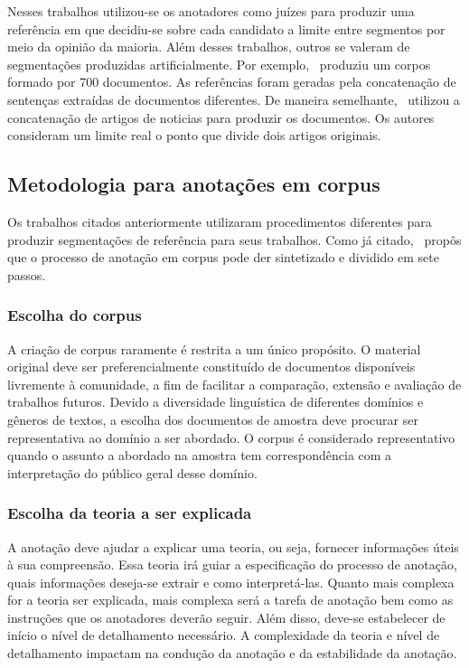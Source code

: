 Nesses trabalhos utilizou-se os anotadores como juízes para produzir uma referência em que decidiu-se sobre cada candidato a limite entre segmentos por meio da opinião da maioria. Além desses trabalhos, outros se valeram de segmentações produzidas artificialmente. Por exemplo,~\cite{Choi2000a} produziu um corpos formado por 700 documentos. As referências foram geradas pela concatenação de sentenças extraídas de documentos diferentes. De maneira semelhante,~\cite{CHAIBI2014} utilizou a concatenação de artigos de noticias para produzir os documentos. Os autores consideram um limite real o ponto que divide dois artigos originais. 

\subsection{Metodologia para anotações em corpus}
\label{subsec:anotacoes}


Os trabalhos citados anteriormente utilizaram procedimentos diferentes para produzir segmentações de referência para seus trabalhos. Como já citado,~\cite{Hovy2010} propôs que o processo de anotação em corpus pode der sintetizado e dividido em sete passos. 


\subsubsection{Escolha do corpus}
A criação de corpus raramente é restrita a um único propósito. O material original deve ser preferencialmente constituído de documentos disponíveis livremente à comunidade, a fim de facilitar a comparação, extensão e avaliação de trabalhos futuros. 
Devido a diversidade linguística de diferentes domínios e gêneros de textos, a escolha dos documentos de amostra deve procurar ser representativa ao domínio a ser abordado. O corpus é considerado representativo quando o assunto a abordado na amostra tem correspondência com a interpretação do público geral desse domínio.

\subsubsection{Escolha da teoria a ser explicada}
A anotação deve ajudar a explicar uma teoria, ou seja, fornecer informações úteis à sua compreensão. Essa teoria irá guiar a especificação do processo de anotação, quais informações deseja-se extrair e como interpretá-las. Quanto mais complexa for a teoria ser explicada, mais complexa será a tarefa de anotação bem como as instruções que os anotadores deverão seguir. Além disso, deve-se estabelecer de início o nível de detalhamento necessário. 
A complexidade da teoria e nível de detalhamento impactam na condução da anotação e da estabilidade da anotação.

